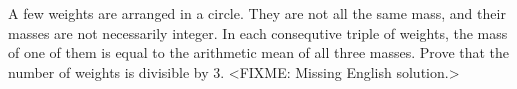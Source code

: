 \problem
A few weights are arranged in a circle.
They are not all the same mass, and their masses are not necessarily integer.
In each consequtive triple of weights, the mass of one of them is equal to the
arithmetic mean of all three masses.
Prove that the number of weights is divisible by 3.
\solution
<FIXME: Missing English solution.>
\endproblem
